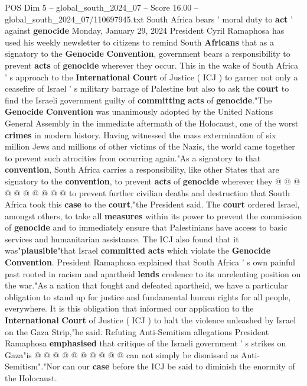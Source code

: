\begin{textsample}{POS Dim 5 – global\_south\_2024\_07 – Score 16.00 – global\_south\_2024\_07/110697945.txt}  \label{ex:f5_pos_175}
South Africa bears ' moral duty to \textbf{act} ' against \textbf{genocide} Monday, January 29, 2024 President Cyril Ramaphosa has used his weekly newsletter to citizens to remind South \textbf{Africans} that as a signatory to the \textbf{Genocide} \textbf{Convention}, government bears a responsibility to prevent \textbf{acts} of \textbf{genocide} wherever they occur.
This in the wake of South Africa ' s approach to the \textbf{International} \textbf{Court} of Justice ( ICJ ) to garner not only a ceasefire of Israel ' s military barrage of Palestine but also to ask the \textbf{court} to find the Israeli government guilty of \textbf{committing} \textbf{acts} of \textbf{genocide}."The \textbf{Genocide} \textbf{Convention} was unanimously adopted by the United Nations General Assembly in the immediate aftermath of the Holocaust, one of the worst \textbf{crimes} in modern history.
Having witnessed the mass extermination of six million Jews and millions of other victims of the Nazis, the world came together to prevent such atrocities from occurring again."As a signatory to that \textbf{convention}, South Africa carries a responsibility, like other States that are signatory to the \textbf{convention}, to prevent \textbf{acts} of \textbf{genocide} wherever they @ @ @ @ @ @ @ @ @ @ to prevent further civilian deaths and destruction that South Africa took this \textbf{case} to the \textbf{court},"the President said.
The \textbf{court} ordered Israel, amongst others, to take all \textbf{measures} within its power to prevent the commission of \textbf{genocide} and to immediately ensure that Palestinians have access to basic services and humanitarian assistance.
The ICJ also found that it was"\textbf{plausible}"that Israel \textbf{committed} \textbf{acts} which violate the \textbf{Genocide} \textbf{Convention}.
President Ramaphosa explained that South Africa ' s own painful past rooted in racism and apartheid \textbf{lends} credence to its unrelenting position on the war."As a nation that fought and defeated apartheid, we have a particular obligation to stand up for justice and fundamental human rights for all people, everywhere.
It is this obligation that informed our application to the \textbf{International} \textbf{Court} of Justice ( ICJ ) to halt the violence unleashed by Israel on the Gaza Strip,"he said.
Refuting Anti-Semitism allegations President Ramaphosa \textbf{emphasised} that critique of the Israeli government ' s strikes on Gaza"is @ @ @ @ @ @ @ @ @ @ can not simply be dismissed as Anti-Semitism"."Nor can our \textbf{case} before the ICJ be said to diminish the enormity of the Holocaust.

\end{textsample}
